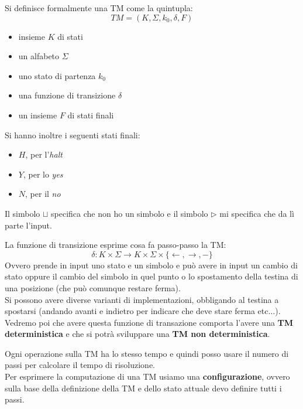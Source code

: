 \documentclass[a4paper,12pt, oneside]{book}
\begin{document}
\begin{definizione}
  Si definisce formalmente una TM come la quintupla:
  \[TM=(K,\Sigma,k_0, \delta, F)\]
  \begin{itemize}
    \item insieme $K$ di stati
    \item un alfabeto $\Sigma$
    \item uno stato di partenza $k_0$
    \item una funzione di transizione $\delta$
    \item un insieme $F$ di stati finali
  \end{itemize}
  Si hanno inoltre i seguenti stati finali:
  \begin{itemize}
    \item $H$, per l'\textit{halt}
    \item $Y$, per lo \textit{yes}
    \item $N$, per il \textit{no}
  \end{itemize}
  Il simbolo $\sqcup$ specifica che non ho un simbolo e il simbolo
  $\triangleright$ mi specifica che da lì parte l'input.
\end{definizione}
\begin{definizione}
  La funzione di transizione esprime cosa fa passo-passo la TM:
  \[\delta:K\times\Sigma\to K\times \Sigma\times\{\leftarrow,\rightarrow,-\}\]
  Ovvero prende in input uno stato e un simbolo e può avere in input un cambio
  di stato oppure il cambio del simbolo in quel punto o lo spostamento della
  testina di una posizione (che può comunque restare ferma).\\
  Si possono avere diverse varianti di implementazioni, obbligando al testina a
  spostarsi (andando avanti e indietro per indicare che deve stare ferma
  etc$\ldots$).\\
  Vedremo poi che avere questa funzione di transazione comporta l'avere una
  \textbf{TM deterministica} e che si potrà sviluppare una \textbf{TM non
    deterministica}.
\end{definizione}
Ogni operazione sulla TM ha lo stesso tempo e quindi posso usare il numero di
passi per calcolare il tempo di risoluzione.\\
Per esprimere la computazione di una TM usiamo una \textbf{configurazione},
ovvero sulla base della definizione della TM e dello stato attuale devo
definire tutti i passi.
\end{document}
